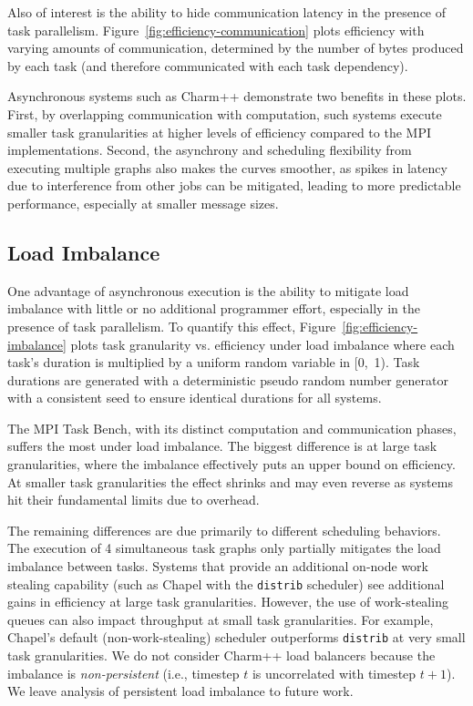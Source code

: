 Also of interest is the ability to
hide communication latency in the presence of task
parallelism. Figure~\ref{fig:efficiency-communication} plots efficiency with varying amounts of
communication, determined by the number
of bytes produced by each task (and therefore communicated with each
task dependency).

Asynchronous systems such as Charm++ demonstrate two benefits in
these plots. First, by overlapping communication with computation,
such systems execute smaller task granularities at higher
levels of efficiency compared to the MPI
implementations. Second, the asynchrony and scheduling flexibility from
executing multiple graphs also makes the curves smoother,
as spikes in latency due to interference from other jobs can be
mitigated, leading to more predictable performance, especially at
smaller message sizes.

{\color{blue}
\subsection{Load Imbalance}



One advantage of asynchronous execution is
the ability to mitigate load imbalance with little or no additional programmer effort, especially in the presence of
task parallelism. To quantify this effect,
Figure~\ref{fig:efficiency-imbalance} plots task granularity vs.
efficiency under load imbalance where each task's duration is multiplied by a uniform random variable in [0,~1). Task durations are generated with a deterministic
pseudo random number generator with a consistent seed to ensure
identical durations for all systems.

The MPI Task Bench, with its distinct computation and communication phases,
suffers the most under load imbalance. The biggest
difference is at large task granularities, where the imbalance
effectively puts an upper bound on efficiency. At smaller task
granularities the effect shrinks and may even reverse as systems hit
their fundamental limits due to overhead.

The remaining differences are due primarily to
different scheduling behaviors. The execution of 4
simultaneous task graphs only partially mitigates the
load imbalance between tasks. Systems that provide an
additional on-node work stealing capability (such as Chapel with the \texttt{distrib} scheduler) see additional gains in
efficiency at large task granularities. However, the use of
work-stealing queues can also impact throughput at small task
granularities. For example, Chapel's default (non-work-stealing) scheduler outperforms \texttt{distrib} at very small task granularities. We do not consider Charm++ load balancers because the imbalance is \emph{non-persistent} (i.e., timestep $t$ is uncorrelated with timestep $t+1$). We leave analysis of persistent load imbalance to future work.
}

